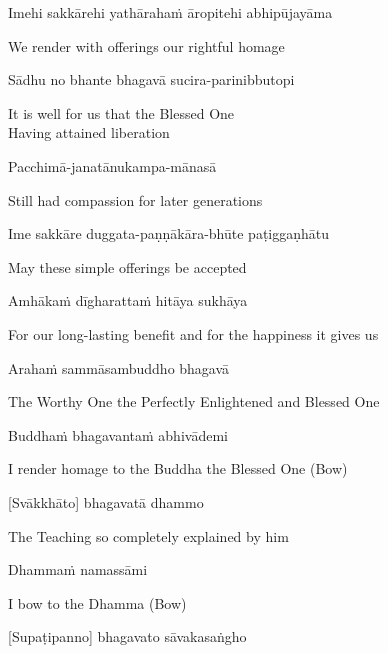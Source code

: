 Imehi sakkārehi yathārahaṁ āropitehi abhipūjayāma

\begin{english}
  We render with offerings our rightful homage
\end{english}

Sādhu no bhante bhagavā sucira-parinibbutopi

\begin{english}
  It is well for us that the Blessed One\\
  Having attained liberation
\end{english}

Pacchimā-janatānukampa-mānasā

\begin{english}
  Still had compassion for later generations
\end{english}

Ime sakkāre duggata-paṇṇākāra-bhūte paṭiggaṇhātu

\begin{english}
  May these simple offerings be accepted
\end{english}

Amhākaṁ dīgharattaṁ hitāya sukhāya

\begin{english}
  For our long-lasting benefit and for the happiness it gives us
\end{english}

Arahaṁ sammāsambuddho bhagavā

\begin{english}
  The Worthy One the Perfectly Enlightened and Blessed One
\end{english}

Buddhaṁ bhagavantaṁ abhivādemi\relax

\begin{english}
  I render homage to the Buddha the Blessed One \hfill{(Bow)}
\end{english}

[Svākkhāto] bhagavatā dhammo

\begin{english}
  The Teaching so completely explained by him
\end{english}

Dhammaṁ namassāmi\relax

\begin{english}
  I bow to the Dhamma \hfill{(Bow)}
\end{english}

[Supaṭipanno] bhagavato sāvakasaṅgho

